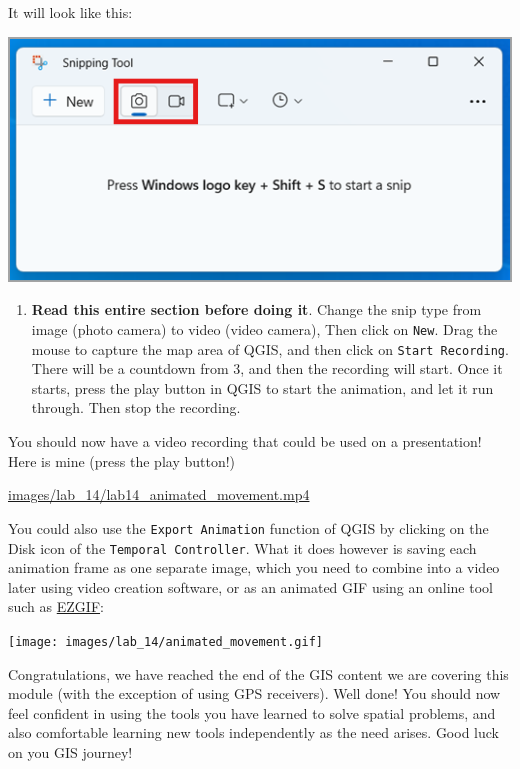 \documentclass[
  letterpaper,
  DIV=11,
  numbers=noendperiod]{scrreprt}
\providecommand{\tightlist}{%
  \setlength{\itemsep}{0pt}\setlength{\parskip}{0pt}}\usepackage{longtable,booktabs,array}
\begin{document}
It will look like this:

\includegraphics{images/lab_14/lab14_fig6_snipping_tool.png}

\begin{enumerate}
\def\labelenumi{(\arabic{enumi})}
\setcounter{enumi}{366}
\tightlist
\item
  \textbf{Read this entire section before doing it}. Change the snip
  type from image (photo camera) to video (video camera), Then click on
  \texttt{New}. Drag the mouse to capture the map area of QGIS, and then
  click on \texttt{Start\ Recording}. There will be a countdown from 3,
  and then the recording will start. Once it starts, press the play
  button in QGIS to start the animation, and let it run through. Then
  stop the recording.
\end{enumerate}

You should now have a video recording that could be used on a
presentation! Here is mine (press the play button!)

\url{images/lab_14/lab14_animated_movement.mp4}

You could also use the \texttt{Export\ Animation} function of QGIS by
clicking on the Disk icon of the \texttt{Temporal\ Controller}. What it
does however is saving each animation frame as one separate image, which
you need to combine into a video later using video creation software, or
as an animated GIF using an online tool such as
\href{https://ezgif.com/maker}{EZGIF}:

\texttt{[image: images/lab\_14/animated\_movement.gif]}

Congratulations, we have reached the end of the GIS content we are
covering this module (with the exception of using GPS receivers). Well
done! You should now feel confident in using the tools you have learned
to solve spatial problems, and also comfortable learning new tools
independently as the need arises. Good luck on you GIS journey!
\end{document}
